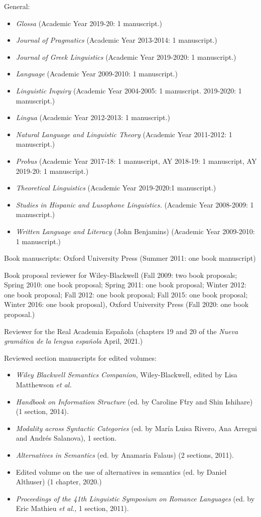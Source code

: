 \documentclass[11pt]{article}
\begin{document}
General:
\begin{itemize}
\item[] \textit{Glossa} (Academic Year 2019-20: 1 manuscript.)
\item[] \textit{Journal of Pragmatics} (Academic Year
  2013-2014: 1
  manuscript.)
  \item[] \textit{Journal of Greek Linguistics} (Academic Year
    2019-2020: 1
    manuscript.)
\item[] \textit{Language} (Academic Year  2009-2010: 1 manuscript.)
\item[] \textit{Linguistic Inquiry} (Academic Year  2004-2005: 1 manuscript. 2019-2020: 1 manuscript.)
\item[] \textit{Lingua} (Academic Year  2012-2013: 1 manuscript.)
\item[] \textit{Natural Language and Linguistic Theory} (Academic Year
  2011-2012: 1
  manuscript.)
  \item[] \textit{Probus} (Academic Year 2017-18: 1 manuscript, AY 2018-19: 1 manuscript, AY 2019-20: 1 manuscript.)
  \item[] \textit{Theoretical Linguistics} (Academic Year 2019-2020:1 manuscript.)
\item[] \textit{Studies in Hispanic and Lusophone Linguistics.} (Academic Year 
  2008-2009: 1 manuscript.)
\item[] \textit{Written Language and Literacy} (John Benjamins) (Academic Year 
  2009-2010: 1 manuscript.)
\end{itemize}


Book manuscripts: Oxford University Press
(Summer 2011: one book manuscript)

Book proposal reviewer for Wiley-Blackwell (Fall 2009: two book
proposals; Spring 2010: one book
proposal; Spring 2011: one book proposal; Winter 2012: one book
proposal; Fall 2012: one book proposal; Fall 2015: one book proposal; Winter 2016: one book proposal), Oxford University Press (Fall 2020: one book proposal.)

Reviewer for the Real Academia Espa\~nola (chapters 19 and 20 of the \textit{Nueva gramática de la lengua española} April, 2021.)

Reviewed section manuscripts for edited volumes: 
\begin{itemize}
\item[] \textit{Wiley Blackwell Semantics Companion}, Wiley-Blackwell, edited by Lisa Matthewson \textit{et al.}
\item[] \textit{Handbook on Information Structure} (ed. by Caroline F\'try and Shin Ishihare) (1 section, 2014).
\item[] \textit{Modality across Syntactic Categories} (ed. by Mar\'ia Luisa Rivero, Ana Arregui and Andr\'es Salanova), 1 section.
\item[] \textit{Alternatives in Semantics} (ed. by Anamaria Falaus) (2
  sections, 2011).
  \item [] Edited volume on the use of alternatives in semantics (ed. by Daniel Althuser) (1 chapter, 2020.)
\item[] \textit{Proceedings of the 41th Linguistic Symposium on
    Romance Languages} (ed. by Eric Mathieu \textit{et al.}, 1
  section, 2011).
\end{itemize}
\end{document}
